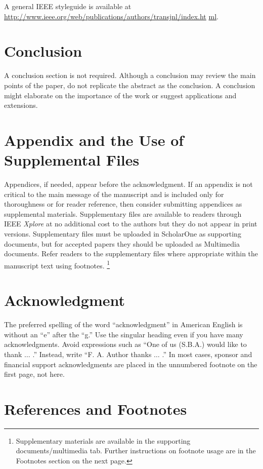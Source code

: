 \documentclass[journal,twoside,web]{ieeecolor}
\begin{document}
A general IEEE styleguide is available at \underline{http://www.ieee.org/web/publications/authors/transjnl/index.ht}
\discretionary{}{}{}\underline{ml}.

\section{Conclusion}
A conclusion section is not required. Although a conclusion may review the
main points of the paper, do not replicate the abstract as the conclusion.
A conclusion might elaborate on the importance of the work or suggest
applications and extensions.

\appendices

\section*{Appendix and the Use of Supplemental Files}
Appendices, if needed, appear before the acknowledgment. If an appendix is not
critical to the main message of the manuscript and is included only for thoroughness
or for reader reference, then consider submitting appendices as supplemental materials.
Supplementary files are available to readers through IEEE \emph{Xplore\textregistered}
at no additional cost to the authors but they do not appear in print versions.
Supplementary files must be uploaded in ScholarOne as supporting documents, but for
accepted papers they should be uploaded as Multimedia documents. Refer readers
to the supplementary files where appropriate within the manuscript text using footnotes.
\footnote{Supplementary materials are available in the supporting documents/multimedia tab.
    Further instructions on footnote usage are in the Footnotes section on the next page.}

\section*{Acknowledgment}
The preferred spelling of the word ``acknowledgment'' in American English is
without an ``e'' after the ``g.'' Use the singular heading even if you have
many acknowledgments. Avoid expressions such as ``One of us (S.B.A.) would
like to thank $\ldots$ .'' Instead, write ``F. A. Author thanks $\ldots$ .'' In most
cases, sponsor and financial support acknowledgments are placed in the
unnumbered footnote on the first page, not here.

\section*{References and Footnotes}
\end{document}
